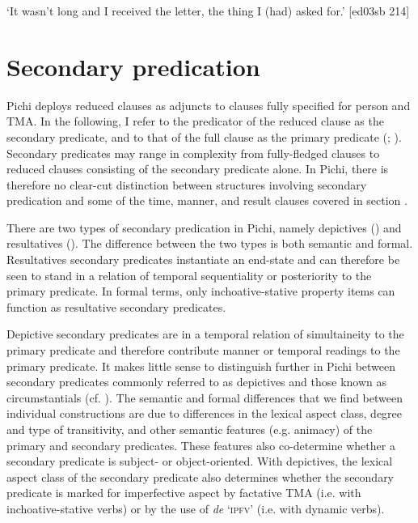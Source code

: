 \glt ‘It wasn’t long and I received the letter, the thing I (had) asked for.’ [ed03sb 214]
\z

\section{Secondary predication}\label{sec:11.3}

Pichi deploys reduced clauses as adjuncts to clauses fully specified for person and TMA. In the following, I refer to the predicator of the reduced clause as the secondary predicate, and to that of the full clause as the primary predicate (\citealt{BerndtHimmelmann2004}; \citealt{Berndt2006}). Secondary predicates may range in complexity from fully-fledged clauses to reduced clauses consisting of the secondary predicate alone. In Pichi, there is therefore no clear-cut distinction between structures involving secondary predication and some of the time, manner, and result clauses covered in section .


There are two types of secondary predication in Pichi, namely depictives () and resultatives (). The difference between the two types is both semantic and formal. Resultatives secondary predicates instantiate an end-state and can therefore be seen to stand in a relation of temporal sequentiality or posteriority to the primary predicate. In formal terms, only inchoative-stative property items can function as resultative secondary predicates.



Depictive secondary predicates are in a temporal relation of simultaineity to the primary predicate and therefore contribute manner or temporal readings to the primary predicate. It makes little sense to distinguish further in Pichi between secondary predicates commonly referred to as depictives and those known as circumstantials (cf. \citealt{Berndt2006}). The semantic and formal differences that we find between individual constructions are due to differences in the lexical aspect class, degree and type of transitivity, and other semantic features (e.g. animacy) of the primary and secondary predicates. These features also co-determine whether a secondary predicate is subject- or object-oriented. With depictives, the lexical aspect class of the secondary predicate also determines whether the secondary predicate is marked for imperfective aspect by factative TMA (i.e. with inchoative-stative verbs) or by the use of \textit{de} ‘\textsc{ipfv}’ (i.e. with dynamic verbs).


